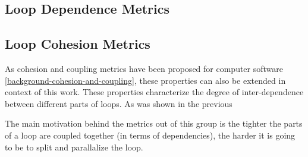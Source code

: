 \subsection{Loop Dependence Metrics}
\label{metrics-loop-dependence-metrics}

\subsection{Loop Cohesion Metrics}
\label{metrics-loop-cohesion-metrics}
\qquad As cohesion and coupling metrics have been proposed for computer software \ref{background-cohesion-and-coupling}, these properties can also be extended in context of this work. \newline
\null\qquad These properties characterize the degree of inter-dependence between different parts of loops. As was shown in the previous 

The main motivation behind the metrics out of this group is the tighter the parts of a loop are coupled together (in terms of dependencies), the harder it is going to be to split and parallalize the loop.   


